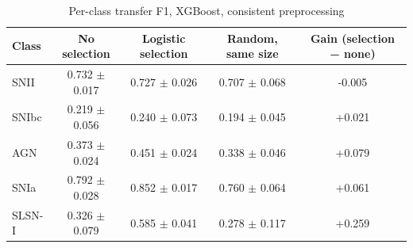 \begin{table}
\centering
\caption{Per-class transfer F1, XGBoost, consistent preprocessing}
\begin{tabular}{lcccc}
\hline
Class & No selection & Logistic selection & Random, same size & Gain (selection − none) \\
\hline
SNII & 0.732 $\pm$ 0.017 & 0.727 $\pm$ 0.026 & 0.707 $\pm$ 0.068 & -0.005 \\
SNIbc & 0.219 $\pm$ 0.056 & 0.240 $\pm$ 0.073 & 0.194 $\pm$ 0.045 & +0.021 \\
AGN & 0.373 $\pm$ 0.024 & 0.451 $\pm$ 0.024 & 0.338 $\pm$ 0.046 & +0.079 \\
SNIa & 0.792 $\pm$ 0.028 & 0.852 $\pm$ 0.017 & 0.760 $\pm$ 0.064 & +0.061 \\
SLSN-I & 0.326 $\pm$ 0.079 & 0.585 $\pm$ 0.041 & 0.278 $\pm$ 0.117 & +0.259 \\
\hline
\end{tabular}
\end{table}
